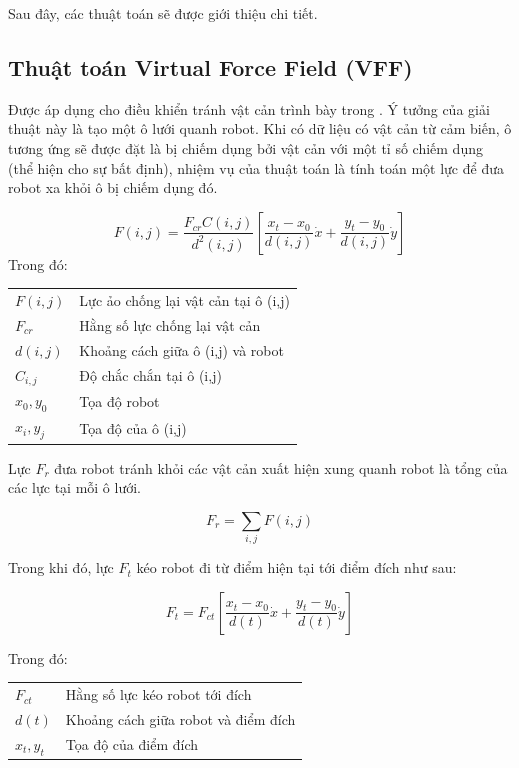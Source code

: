 Sau đây, các thuật toán sẽ được giới thiệu chi tiết.

\subsection{Thuật toán Virtual Force Field (VFF)}

Được áp dụng cho điều khiển tránh vật cản trình bày trong \cite{Borenstein1988,Borenstein1989}. Ý tưởng của giải thuật này là tạo một ô lưới quanh robot. Khi có dữ liệu có vật cản từ cảm biến, ô tương ứng sẽ được đặt là bị chiếm dụng bởi vật cản với một tỉ số chiếm dụng (thể hiện cho sự bất định), nhiệm vụ của thuật toán là tính toán một lực để đưa robot xa khỏi ô bị chiếm dụng đó.


\begin{equation}
  F(i,j) = \frac{{F}_{cr}C(i,j)}{{d}^{2}(i,j)}\left [\frac{{x}_{t}-{x}_{0}}{d(i,j)}\dot{x} + \frac{{y}_{t}-{y}_{0}}{d(i,j)}\dot{y}
  \right ]
\end{equation}
Trong đó:

\begin{tabular}{ll}
  $F(i,j)$      & Lực ảo chống lại vật cản tại ô (i,j) \\
  ${F}_{cr}$    & Hằng số lực chống lại vật cản  \\
  $d(i,j)$      & Khoảng cách giữa ô (i,j) và robot \\
  ${C}_{i,j}$   & Độ chắc chắn tại ô (i,j)  \\
  ${x}_{0}, {y}_{0}$ & Tọa độ robot \\
  ${x}_{i}, {y}_{j}$ & Tọa độ của ô (i,j)
\end{tabular}

Lực ${F}_{r}$ đưa robot tránh khỏi các vật cản xuất hiện xung quanh robot là tổng của các lực tại mỗi ô lưới.

\begin{equation}
  {F}_{r} = \sum\limits_{i,j}{F(i,j)}
\end{equation}

Trong khi đó, lực ${F}_{t}$ kéo robot đi từ điểm hiện tại tới điểm đích như sau:

\begin{equation}
  {F}_{t} = {F}_{ct} \left [\frac{{x}_{t}-{x}_{0}}{d(t)}\dot{x} + \frac{{y}_{t}-{y}_{0}}{d(t)}\dot{y}
  \right ]
\end{equation}

Trong đó:

\begin{tabular} {ll}
  ${F}_{ct}$    & Hằng số lực kéo robot tới đích \\
  $d(t)$        & Khoảng cách giữa robot và điểm đích \\
  ${x}_{t}, {y}_{t}$ & Tọa độ của điểm đích
\end{tabular}

